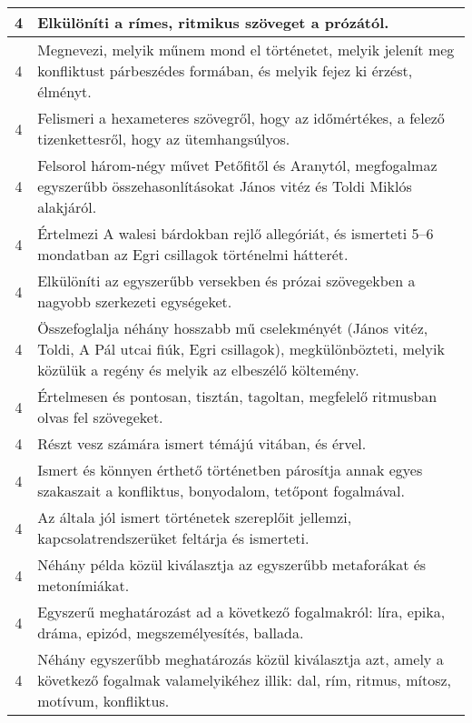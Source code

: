 \begin{longtable}{c | p{12cm} }
                                          4 &  Elkülöníti a rímes, ritmikus szöveget a prózától. \\ \hline
                                          4 &  Megnevezi, melyik műnem mond el történetet, melyik jelenít meg konfliktust párbeszédes formában, és melyik fejez ki érzést, élményt. \\ \hline
                                          4 &  Felismeri a hexameteres szövegről, hogy az időmértékes, a felező tizenkettesről, hogy az ütemhangsúlyos. \\ \hline
                                          4 &  Felsorol három-négy művet Petőfitől és Aranytól, megfogalmaz egyszerűbb  összehasonlításokat János vitéz és Toldi Miklós alakjáról. \\ \hline
                                          4 &  Értelmezi A walesi bárdokban rejlő allegóriát, és ismerteti 5–6 mondatban az Egri csillagok történelmi hátterét. \\ \hline
                                          4 &  Elkülöníti az egyszerűbb versekben és prózai szövegekben a nagyobb szerkezeti egységeket. \\ \hline
                                          4 &  Összefoglalja néhány hosszabb mű cselekményét (János vitéz, Toldi, A Pál utcai fiúk, Egri csillagok), megkülönbözteti, melyik közülük a regény és melyik az elbeszélő költemény. \\ \hline
                                          4 &  Értelmesen és pontosan, tisztán, tagoltan, megfelelő ritmusban olvas fel szövegeket. \\ \hline
                                          4 &  Részt vesz számára ismert témájú vitában, és érvel. \\ \hline
                                          4 &  Ismert és könnyen érthető történetben párosítja annak egyes szakaszait a konfliktus, bonyodalom, tetőpont fogalmával. \\ \hline
                                          4 &  Az általa jól ismert történetek szereplőit jellemzi, kapcsolatrendszerüket feltárja és ismerteti. \\ \hline
                                          4 &  Néhány példa közül kiválasztja az egyszerűbb metaforákat és metonímiákat. \\ \hline
                                          4 &  Egyszerű meghatározást ad a következő fogalmakról: líra, epika, dráma, epizód, megszemélyesítés, ballada. \\ \hline
                                          4 &  Néhány egyszerűbb meghatározás közül kiválasztja azt, amely a következő fogalmak valamelyikéhez illik: dal, rím, ritmus, mítosz, motívum, konfliktus. \\ \hline

\end{longtable}
